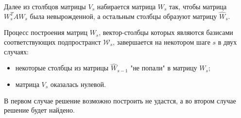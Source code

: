 Далее из столбцов матрицы $V_s$ набирается матрица $W_s$ так, чтобы матрица $W_s^T A W_s$ была невырожденной, а остальным столбцы образуют
матрицу $\widehat{W}_s$.

Процесс построения матриц $W_s$, вектор-столбцы которых являются базисами соответствующих подпространст $\mathcal W_s$, завершается 
на некотором шаге $s$ в двух случаях:

\begin{itemize}
	\item некоторые столбцы из матрицы $\widehat{W}_{s-1}$ "не попали"{} в матрицу $W_s$;
	\item матрица $V_s$ оказалась нулевой.
\end{itemize}

В первом случае решение возможно построить не удастся, а во втором случае решение будет найдено.
